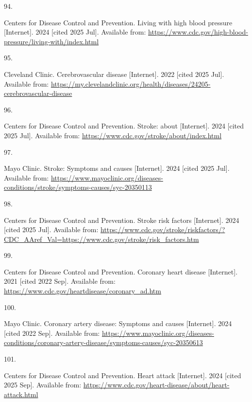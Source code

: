 \documentclass[
  english,
  letterpaper,
]{report}
\newlength{\cslhangindent}
\newlength{\csllabelwidth}
\newenvironment{CSLReferences}[2] %
 {\begin{list}{}{%
  \setlength{\itemindent}{0pt}
  \setlength{\leftmargin}{0pt}
  \setlength{\parsep}{0pt}
  \ifodd #1
   \setlength{\leftmargin}{\cslhangindent}
   \setlength{\itemindent}{-1\cslhangindent}
  \fi
  \setlength{\itemsep}{#2\baselineskip}}}
 {\end{list}}
\newcommand{\CSLLeftMargin}[1]{\parbox[t]{\csllabelwidth}{\strut#1\strut}}
\newcommand{\CSLRightInline}[1]{\parbox[t]{\linewidth - \csllabelwidth}{\strut#1\strut}}
\begin{document}
\begin{CSLReferences}{0}{1}
\CSLLeftMargin{94. }%
\CSLRightInline{Centers for Disease Control and Prevention. Living with
high blood pressure {[}Internet{]}. 2024 {[}cited 2025 Jul{]}. Available
from:
\url{https://www.cdc.gov/high-blood-pressure/living-with/index.html}}

\CSLLeftMargin{95. }%
\CSLRightInline{Cleveland Clinic. Cerebrovascular disease
{[}Internet{]}. 2022 {[}cited 2025 Jul{]}. Available from:
\url{https://my.clevelandclinic.org/health/diseases/24205-cerebrovascular-disease}}

\CSLLeftMargin{96. }%
\CSLRightInline{Centers for Disease Control and Prevention. Stroke:
about {[}Internet{]}. 2024 {[}cited 2025 Jul{]}. Available from:
\url{https://www.cdc.gov/stroke/about/index.html}}

\CSLLeftMargin{97. }%
\CSLRightInline{Mayo Clinic. Stroke: Symptoms and causes {[}Internet{]}.
2024 {[}cited 2025 Jul{]}. Available from:
\url{https://www.mayoclinic.org/diseases-conditions/stroke/symptoms-causes/syc-20350113}}

\CSLLeftMargin{98. }%
\CSLRightInline{Centers for Disease Control and Prevention. Stroke risk
factors {[}Internet{]}. 2024 {[}cited 2025 Jul{]}. Available from:
\url{https://www.cdc.gov/stroke/riskfactors/?CDC_AAref_Val=https://www.cdc.gov/stroke/risk_factors.htm}}

\CSLLeftMargin{99. }%
\CSLRightInline{Centers for Disease Control and Prevention. Coronary
heart disease {[}Internet{]}. 2021 {[}cited 2022 Sep{]}. Available from:
\url{https://www.cdc.gov/heartdisease/coronary_ad.htm}}

\CSLLeftMargin{100. }%
\CSLRightInline{Mayo Clinic. Coronary artery disease: Symptoms and
causes {[}Internet{]}. 2024 {[}cited 2022 Sep{]}. Available from:
\url{https://www.mayoclinic.org/diseases-conditions/coronary-artery-disease/symptoms-causes/syc-20350613}}

\CSLLeftMargin{101. }%
\CSLRightInline{Centers for Disease Control and Prevention. Heart attack
{[}Internet{]}. 2024 {[}cited 2025 Sep{]}. Available from:
\url{https://www.cdc.gov/heart-disease/about/heart-attack.html}}


\end{CSLReferences}
\end{document}
